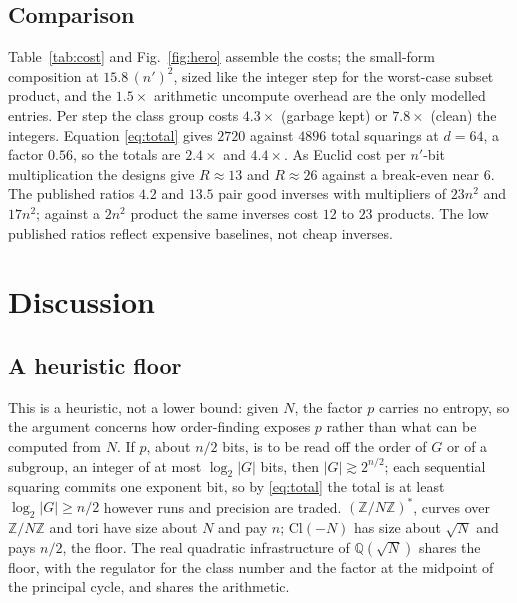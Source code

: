 \documentclass[conference]{IEEEtran}
\newcommand{\Cl}{\mathrm{Cl}}
\newcommand{\Z}{\mathbb{Z}}
\newcommand{\Q}{\mathbb{Q}}
\begin{document}
\subsection{Comparison}
Table~\ref{tab:cost} and Fig.~\ref{fig:hero} assemble the costs; the small-form composition at $15.8\,(n')^2$, sized like the integer step for the worst-case subset product, and the $1.5\times$ arithmetic uncompute overhead are the only modelled entries. Per step the class group costs $4.3\times$ (garbage kept) or $7.8\times$ (clean) the integers. Equation \eqref{eq:total} gives $2720$ against $4896$ total squarings at $d=64$, a factor $0.56$, so the totals are $2.4\times$ and $4.4\times$. As Euclid cost per $n'$-bit multiplication the designs give $R\approx13$ and $R\approx26$ against a break-even near $6$. The published ratios $4.2$ \cite{roetteler2017} and $13.5$ \cite{luo2026b} pair good inverses with multipliers of $23n^2$ and $17n^2$; against a $2n^2$ product the same inverses cost $12$ to $23$ products. The low published ratios reflect expensive baselines, not cheap inverses.

\begin{table}[t]
\caption{Toffoli cost of one sequential squaring step at $n=4096$, in units of $(n')^2$ with $n'=2048$, under the convention of Section~\ref{sec:cost}.C.}
\label{tab:cost}
\centering

\end{table}

\section{Discussion}\label{sec:disc}
\subsection{A heuristic floor}\label{sec:floor}
This is a heuristic, not a lower bound: given $N$, the factor $p$ carries no entropy, so the argument concerns how order-finding exposes $p$ rather than what can be computed from $N$. If $p$, about $n/2$ bits, is to be read off the order of $G$ or of a subgroup, an integer of at most $\log_2|G|$ bits, then $|G|\gtrsim2^{n/2}$; each sequential squaring commits one exponent bit, so by \eqref{eq:total} the total is at least $\log_2|G|\ge n/2$ however runs and precision are traded. $(\Z/N\Z)^*$, curves over $\Z/N\Z$ and tori have size about $N$ and pay $n$; $\Cl(-N)$ has size about $\sqrt N$ and pays $n/2$, the floor. The real quadratic infrastructure of $\Q(\sqrt N)$ shares the floor, with the regulator for the class number and the factor at the midpoint of the principal cycle, and shares the arithmetic.
\end{document}

